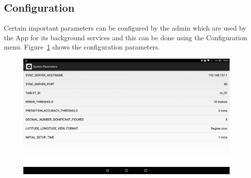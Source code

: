 \subsection{Configuration}
\label{subsec:subsec7_2_3}
\noindent
Certain important parameters can be configured by the admin which are used by the App for its background services and this can be done using the Configuration menu. Figure~\ref{fig:CH7ConfigParams} shows the configuration parameters. 
\begin{figure}[h]
	\centering
	\includegraphics[height=0.3\textheight]{fig07/ConfigParameters.png}
	\label{fig:CH7ConfigParams}
\end{figure}
%
